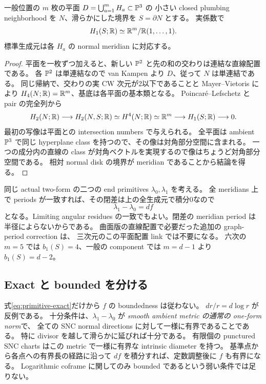 \begin{proposition}\label{prop:link-h1}
一般位置の $m$ 枚の平面 $D=\bigcup_{a=1}^mH_a\subset\mathbb P^3$ の
小さい closed plumbing neighborhood を $N$、滑らかにした境界を $S=\partial N$ とする。
実係数で
\begin{equation}\label{eq:link-h1}
H_1(S;\mathbb R)\simeq\mathbb R^m/\mathbb R(1,\ldots,1).
\end{equation}
標準生成元は各 $H_a$ の normal meridian に対応する。
\end{proposition}

\begin{proof}
平面を一枚ずつ加えると、新しい $\mathbb P^2$ と先の和の交わりは連結な直線配置である。
各 $\mathbb P^2$ は単連結なので van Kampen より $D$、従って $N$ は単連結である。
同じ帰納で、交わりの実 CW 次元が2以下であることと Mayer--Vietoris により
$H_4(N;\mathbb R)=\mathbb R^m$、基底は各平面の基本類となる。
Poincaré--Lefschetz と pair の完全列から
\[
H_2(N;\mathbb R)\longrightarrow
H_2(N,S;\mathbb R)\simeq H^4(N;\mathbb R)\simeq\mathbb R^m
\longrightarrow H_1(S;\mathbb R)\longrightarrow0.
\]
最初の写像は平面との intersection numbers で与えられる。
全平面は ambient $\mathbb P^3$ で同じ hyperplane class を持つので、その像は対角部分空間に含まれる。
一つの成分内の直線の class が対角ベクトルを実現するので像はちょうど対角部分空間である。
相対 normal disk の境界が meridian であることから結論を得る。
\end{proof}

同じ actual two-form の二つの end primitives $\lambda_0,\lambda_1$ を考える。
全 meridians 上で periods が一致すれば、その閉差は上の全生成元で積分0なので
\begin{equation}\label{eq:primitive-exact}
\lambda_1-\lambda_0=df
\end{equation}
となる。Limiting angular residues の一致でもよい。閉差の meridian period は半径によらないからである。
曲面版の直線配置で必要だった追加の graph-period correction は、
三次元のこの平面配置 link では不要になる。
六次の $m=5$ では $b_1(S)=4$、一般の component では $m=d-1$ より $b_1(S)=d-2$。

\subsection{Exact と bounded を分ける}

式\eqref{eq:primitive-exact}だけから $f$ の boundedness は従わない。
$dr/r=d\log r$ が反例である。
十分条件は、$\lambda_1-\lambda_0$ が
\emph{smooth ambient metric の通常の one-form norm}で、
全ての SNC normal directions に対して一様に有界であることである。
特に divisor を越して滑らかに延びれば十分である。
有限個の punctured SNC charts はこの metric で一様に有界な intrinsic diameter を持つ。
基準点から各点への有界長の経路に沿って $df$ を積分すれば、定数調整後に $f$ も有界になる。
Logarithmic coframe に関してのみ bounded であるという弱い条件では足りない。

